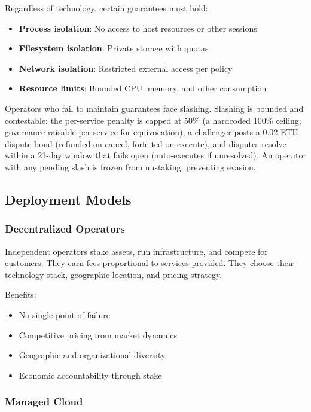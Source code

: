 \documentclass[11pt,a4paper]{article}
\begin{document}
Regardless of technology, certain guarantees must hold:

\begin{itemize}[noitemsep]
    \item \textbf{Process isolation}: No access to host resources or other sessions
    \item \textbf{Filesystem isolation}: Private storage with quotas
    \item \textbf{Network isolation}: Restricted external access per policy
    \item \textbf{Resource limits}: Bounded CPU, memory, and other consumption
\end{itemize}

Operators who fail to maintain guarantees face slashing. Slashing is bounded and contestable: the per-service penalty is capped at 50\% (a hardcoded 100\% ceiling, governance-raisable per service for equivocation), a challenger posts a 0.02 ETH dispute bond (refunded on cancel, forfeited on execute), and disputes resolve within a 21-day window that fails open (auto-executes if unresolved). An operator with any pending slash is frozen from unstaking, preventing evasion.

\subsection{Deployment Models}

\subsubsection{Decentralized Operators}

Independent operators stake assets, run infrastructure, and compete for customers. They earn fees proportional to services provided. They choose their technology stack, geographic location, and pricing strategy.

Benefits:
\begin{itemize}[noitemsep]
    \item No single point of failure
    \item Competitive pricing from market dynamics
    \item Geographic and organizational diversity
    \item Economic accountability through stake
\end{itemize}

\subsubsection{Managed Cloud}
\end{document}
